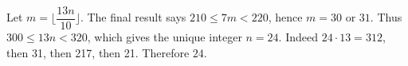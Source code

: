 Let $m=\lfloor\dfrac{13n}{10}\rfloor$. The final result says $210\le7m<220$, hence $m=30$ or $31$. Thus $300\le13n<320$, which gives the unique integer $n=24$. Indeed $24\cdot13=312$, then 31, then 217, then 21. Therefore $\boxed{24}$.
